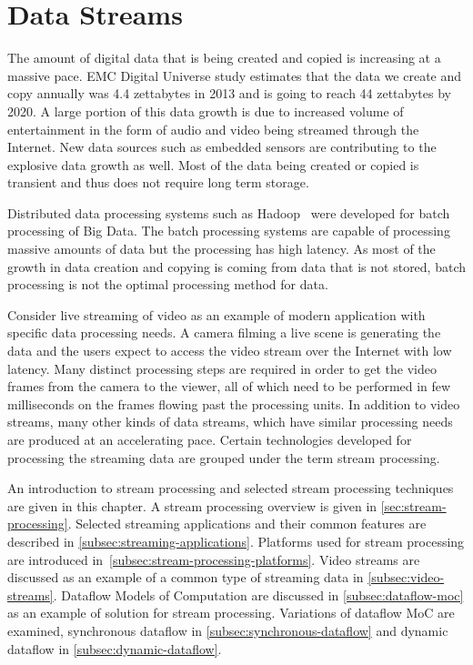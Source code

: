 \chapter{Data Streams}
\label{chapter:streams}
The amount of digital data that is being created and copied is increasing at a massive pace. EMC Digital Universe study \cite{turner2014digital} estimates that the data we create and copy annually was 4.4 zettabytes in 2013 and is going to reach 44 zettabytes by 2020. A large portion of this data growth is due to increased volume of entertainment in the form of audio and video being streamed through the Internet. New data sources such as embedded sensors are contributing to the explosive data growth as well. Most of the data being created or copied is transient and thus does not require long term storage.~\cite{turner2014digital}

Distributed data processing systems such as Hadoop~\cite{white2012hadoop} were developed for batch processing of Big Data. The batch processing systems are capable of processing massive amounts of data but the processing has high latency. As most of the growth in data creation and copying is coming from data that is not stored, batch processing is not the optimal processing method for data.

Consider live streaming of video as an example of modern application with specific data processing needs. A camera filming a live scene is generating the data and the users expect to access the video stream over the Internet with low latency. Many distinct processing steps are required in order to get the video frames from the camera to the viewer, all of which need to be performed in few milliseconds on the frames flowing past the processing units. In addition to video streams, many other kinds of data streams, which have similar processing needs are produced at an accelerating pace. Certain technologies developed for processing the streaming data are grouped under the term stream processing.

An introduction to stream processing and selected stream processing techniques are given in this chapter. A stream processing overview is given in \ref{sec:stream-processing}. Selected streaming applications and their common features are described in \ref{subsec:streaming-applications}. Platforms used for stream processing are introduced in~\ref{subsec:stream-processing-platforms}. Video streams are discussed as an example of a common type of streaming data in \ref{subsec:video-streams}. Dataflow Models of Computation are discussed in \ref{subsec:dataflow-moc} as an example of solution for stream processing. Variations of dataflow MoC are examined, synchronous dataflow in \ref{subsec:synchronous-dataflow} and dynamic dataflow in \ref{subsec:dynamic-dataflow}.

